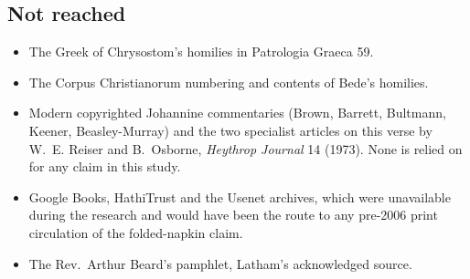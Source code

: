 \subsection*{Not reached}

{\fontsize{8.6}{9.6}\selectfont
\begin{itemize}[itemsep=0pt,parsep=0pt,topsep=0.05em]
\item The Greek of Chrysostom's homilies in Patrologia Graeca 59.
\item The Corpus Christianorum numbering and contents of Bede's homilies.
\item Modern copyrighted Johannine commentaries (Brown, Barrett, Bultmann,
Keener, Beasley-Murray) and the two specialist articles on this verse by W.~E.
Reiser and B.~Osborne, \emph{Heythrop Journal} 14 (1973). None is relied on for
any claim in this study.
\item Google Books, HathiTrust and the Usenet archives, which were unavailable
during the research and would have been the route to any pre-2006 print
circulation of the folded-napkin claim.
\item The Rev.\ Arthur Beard's pamphlet, Latham's acknowledged source.
\end{itemize}}

\endgroup
